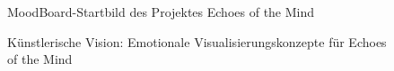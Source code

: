 
\FloatBarrier
\begin{figure}[htbp]
    \centering
    \caption{MoodBoard-Startbild des Projektes \glqq Echoes of the Mind\grqq{}}
    \label{fig:echoes_startbild}
\end{figure}

\begin{figure}[htbp]
    \centering
    \caption{Künstlerische Vision: Emotionale Visualisierungskonzepte für \glqq Echoes of the Mind\grqq{}}
    \label{fig:echoes_mood}
\end{figure}

